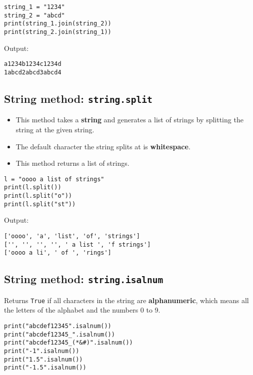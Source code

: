 \documentclass[11pt]{article}
\begin{document}
\begin{verbatim}
string_1 = "1234"
string_2 = "abcd"
print(string_1.join(string_2))
print(string_2.join(string_1))
\end{verbatim}

 \noindent Output:

\begin{verbatim}
a1234b1234c1234d
1abcd2abcd3abcd4
\end{verbatim}

\subsection{String method: \texttt{string.split}}
\label{sec:orgd26e500}
\begin{itemize}
\item This method takes a \textbf{string} and generates a list of strings by splitting the string at the given string.
\item The default character the string splits at is \textbf{whitespace}.
\item This method returns a list of strings.
\end{itemize}

\begin{verbatim}
l = "oooo a list of strings"
print(l.split())
print(l.split("o"))
print(l.split("st"))
\end{verbatim}

 \noindent Output:

\begin{verbatim}
['oooo', 'a', 'list', 'of', 'strings']
['', '', '', '', ' a list ', 'f strings']
['oooo a li', ' of ', 'rings']
\end{verbatim}


 \newpage

\subsection{String method: \texttt{string.isalnum}}
\label{sec:org2f80db9}
Returns \texttt{True} if all characters in the string are \textbf{alphanumeric}, which means all the letters of the alphabet and the numbers 0 to 9.

\begin{verbatim}
print("abcdef12345".isalnum())
print("abcdef12345_".isalnum())
print("abcdef12345_(*&#)".isalnum())
print("-1".isalnum())
print("1.5".isalnum())
print("-1.5".isalnum())
\end{verbatim}
\end{document}

